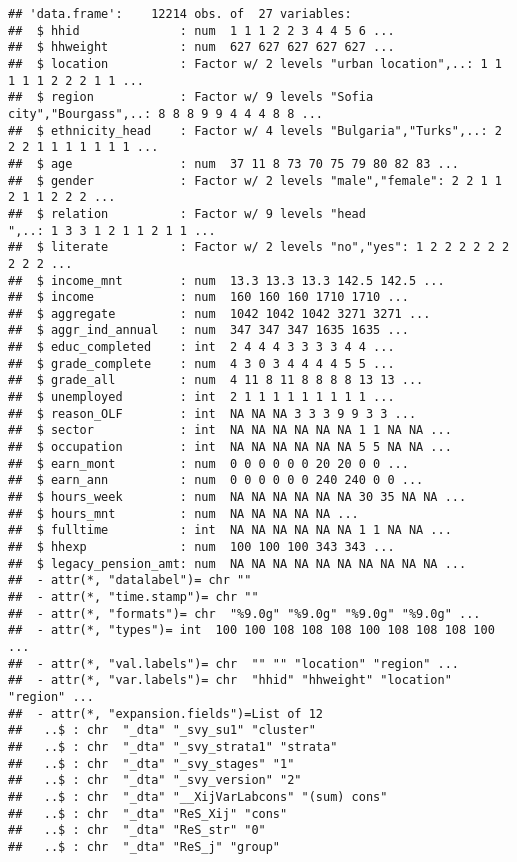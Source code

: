 \documentclass[]{article}
\begin{document}
\begin{verbatim}
## 'data.frame':    12214 obs. of  27 variables:
##  $ hhid              : num  1 1 1 2 2 3 4 4 5 6 ...
##  $ hhweight          : num  627 627 627 627 627 ...
##  $ location          : Factor w/ 2 levels "urban location",..: 1 1 1 1 1 2 2 2 1 1 ...
##  $ region            : Factor w/ 9 levels "Sofia city","Bourgass",..: 8 8 8 9 9 4 4 4 8 8 ...
##  $ ethnicity_head    : Factor w/ 4 levels "Bulgaria","Turks",..: 2 2 2 1 1 1 1 1 1 1 ...
##  $ age               : num  37 11 8 73 70 75 79 80 82 83 ...
##  $ gender            : Factor w/ 2 levels "male","female": 2 2 1 1 2 1 1 2 2 2 ...
##  $ relation          : Factor w/ 9 levels "head                      ",..: 1 3 3 1 2 1 1 2 1 1 ...
##  $ literate          : Factor w/ 2 levels "no","yes": 1 2 2 2 2 2 2 2 2 2 ...
##  $ income_mnt        : num  13.3 13.3 13.3 142.5 142.5 ...
##  $ income            : num  160 160 160 1710 1710 ...
##  $ aggregate         : num  1042 1042 1042 3271 3271 ...
##  $ aggr_ind_annual   : num  347 347 347 1635 1635 ...
##  $ educ_completed    : int  2 4 4 4 3 3 3 3 4 4 ...
##  $ grade_complete    : num  4 3 0 3 4 4 4 4 5 5 ...
##  $ grade_all         : num  4 11 8 11 8 8 8 8 13 13 ...
##  $ unemployed        : int  2 1 1 1 1 1 1 1 1 1 ...
##  $ reason_OLF        : int  NA NA NA 3 3 3 9 9 3 3 ...
##  $ sector            : int  NA NA NA NA NA NA 1 1 NA NA ...
##  $ occupation        : int  NA NA NA NA NA NA 5 5 NA NA ...
##  $ earn_mont         : num  0 0 0 0 0 0 20 20 0 0 ...
##  $ earn_ann          : num  0 0 0 0 0 0 240 240 0 0 ...
##  $ hours_week        : num  NA NA NA NA NA NA 30 35 NA NA ...
##  $ hours_mnt         : num  NA NA NA NA NA ...
##  $ fulltime          : int  NA NA NA NA NA NA 1 1 NA NA ...
##  $ hhexp             : num  100 100 100 343 343 ...
##  $ legacy_pension_amt: num  NA NA NA NA NA NA NA NA NA NA ...
##  - attr(*, "datalabel")= chr ""
##  - attr(*, "time.stamp")= chr ""
##  - attr(*, "formats")= chr  "%9.0g" "%9.0g" "%9.0g" "%9.0g" ...
##  - attr(*, "types")= int  100 100 108 108 108 100 108 108 108 100 ...
##  - attr(*, "val.labels")= chr  "" "" "location" "region" ...
##  - attr(*, "var.labels")= chr  "hhid" "hhweight" "location" "region" ...
##  - attr(*, "expansion.fields")=List of 12
##   ..$ : chr  "_dta" "_svy_su1" "cluster"
##   ..$ : chr  "_dta" "_svy_strata1" "strata"
##   ..$ : chr  "_dta" "_svy_stages" "1"
##   ..$ : chr  "_dta" "_svy_version" "2"
##   ..$ : chr  "_dta" "__XijVarLabcons" "(sum) cons"
##   ..$ : chr  "_dta" "ReS_Xij" "cons"
##   ..$ : chr  "_dta" "ReS_str" "0"
##   ..$ : chr  "_dta" "ReS_j" "group"

\end{verbatim}
\end{document}
